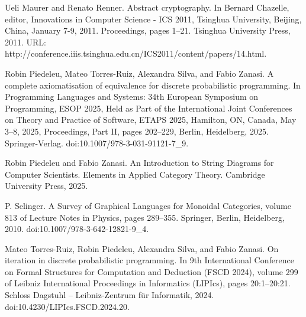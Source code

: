 \documentclass[10pt,a4paper]{article}
\begin{document}
\par\noindent  [20]  Ueli Maurer and Renato Renner.  Abstract cryptography.  In Bernard Chazelle, editor, Innovations in Computer Science - ICS 2011, Tsinghua University, Beijing, China, January 7-9, 2011. Proceedings, pages 1–21. Tsinghua University Press, 2011.  URL: http://conference.iiis.tsinghua.edu.cn/ICS2011/content/papers/14.html.  
 
\par\noindent  [21]  Robin Piedeleu, Mateo Torres-Ruiz, Alexandra Silva, and Fabio Zanasi.  A complete axiomatisation of equivalence for discrete probabilistic programming.  In Programming Languages and Systems: 34th European Symposium on Programming, ESOP 2025, Held as Part of the International Joint Conferences on Theory and Practice of Software, ETAPS 2025, Hamilton, ON, Canada, May 3–8, 2025, Proceedings, Part II, pages 202–229, Berlin, Heidelberg, 2025. Springer-Verlag.  doi:10.1007/978-3-031-91121-7\_9.  
 
\par\noindent  [22]  Robin Piedeleu and Fabio Zanasi.  An Introduction to String Diagrams for Computer Scientists.  Elements in Applied Category Theory. Cambridge University Press, 2025.  
 
\par\noindent  [23]  P. Selinger.  A Survey of Graphical Languages for Monoidal Categories, volume 813 of Lecture Notes in Physics, pages 289–355.  Springer, Berlin, Heidelberg, 2010.  doi:10.1007/978-3-642-12821-9\_4.  
 
\par\noindent  [24]  Mateo Torres-Ruiz, Robin Piedeleu, Alexandra Silva, and Fabio Zanasi.  On iteration in discrete probabilistic programming.  In 9th International Conference on Formal Structures for Computation and Deduction (FSCD 2024), volume 299 of Leibniz International Proceedings in Informatics (LIPIcs), pages 20:1–20:21. Schloss Dagstuhl – Leibniz-Zentrum für Informatik, 2024.  doi:10.4230/LIPIcs.FSCD.2024.20.  
  
\end{document}

